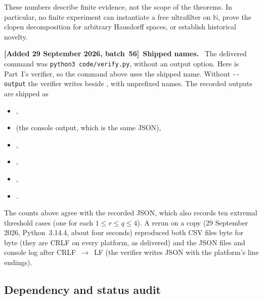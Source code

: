 \documentclass[11pt,letterpaper]{article}
\numberwithin{equation}{section}
\theoremstyle{definition}
\theoremstyle{remark}
\theoremstyle{definition}
\newcommand{\N}{\mathbb N}
\newenvironment{writenotec}[1][]{\par\smallskip\begingroup\small\sloppy
 \noindent\textbf{[Added 29 September 2026, batch~56]}\if\relax\detokenize{#1}\relax\else~\textbf{#1.}\fi\ }%
 {\par\endgroup\smallskip}
\begin{document}
These numbers describe finite evidence, not the scope of the theorems.
In particular, no finite experiment can instantiate a free ultrafilter on
\(\N\), prove the clopen decomposition for arbitrary Hausdorff spaces,
or establish historical novelty.

\begin{writenotec}[Shipped names]
The delivered command was \texttt{python3 code/verify.py}, without an output
option. Here  is Part~I's verifier, so the command
above uses the shipped name. Without \texttt{-{}-output} the verifier writes
 beside , with unprefixed names. The recorded
outputs are shipped as
\begin{itemize}
\item {},
\item {} (the console output,
which is the same JSON),
\item {},
\item {},
\item {},
\item {}.
\end{itemize}
The counts above agree with the recorded JSON, which also records ten extremal
threshold cases (one for each $1\le r\le q\le4$). A rerun on a copy
(29 September 2026, Python~3.14.4, about four seconds) reproduced both CSV
files byte for byte (they are CRLF on every platform, as delivered) and the
JSON files and console log after CRLF~$\to$~LF (the verifier writes JSON with
the platform's line endings).
\end{writenotec}

\subsection{Dependency and status audit}
\end{document}
